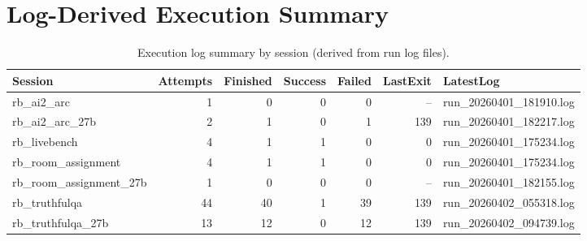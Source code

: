 \documentclass[10pt,twocolumn]{article}
\begin{document}
\section*{Log-Derived Execution Summary}
\begin{table}[t]
\centering
\caption{Execution log summary by session (derived from run log files).}
\label{tab:log_summary}
\begin{adjustbox}{max width=\textwidth}
\begin{tabular}{lrrrrrl}
\toprule
Session & Attempts & Finished & Success & Failed & LastExit & LatestLog \\
\midrule
rb\_ai2\_arc & 1 & 0 & 0 & 0 & -- & run\_20260401\_181910.log \\
rb\_ai2\_arc\_27b & 2 & 1 & 0 & 1 & 139 & run\_20260401\_182217.log \\
rb\_livebench & 4 & 1 & 1 & 0 & 0 & run\_20260401\_175234.log \\
rb\_room\_assignment & 4 & 1 & 1 & 0 & 0 & run\_20260401\_175234.log \\
rb\_room\_assignment\_27b & 1 & 0 & 0 & 0 & -- & run\_20260401\_182155.log \\
rb\_truthfulqa & 44 & 40 & 1 & 39 & 139 & run\_20260402\_055318.log \\
rb\_truthfulqa\_27b & 13 & 12 & 0 & 12 & 139 & run\_20260402\_094739.log \\
\bottomrule
\end{tabular}
\end{adjustbox}
\end{table}
\end{document}
